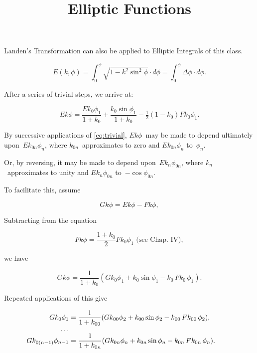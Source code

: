 \documentclass[12pt,letterpaper]{article}
\title{Elliptic Functions}
\begin{document}
	
	Landen's Transformation can also be applied to Elliptic Integrals of this class.
	
	\begin{equation}
	E(k, \phi) = \int_{0}^{\phi} \sqrt{1 - k^{2} \sin^{2} \phi} · d\phi
	= \int_{0}^{\phi} \Delta \phi · d\phi.
	\end{equation}
	
	After a series of trivial steps, we arrive at:
	
	\begin{equation}
	\label{eq:trivial}
	{Ek\phi} = \frac{Ek_{0}\phi_{1}}{1+k_{0}} + \frac{k_{0} \sin \phi_{1}}{1+k_{0}} - \tfrac{1}{2} (1 - k_{0})Fk_{0}\phi_{1}.
	\end{equation}
	
	By successive applications of \ref{eq:trivial}, $Ek\phi$~may be made to depend ultimately upon~$Ek_{0n}\phi_{n}$, where $k_{0n}$~approximates to zero and $Ek_{0n}\phi_{n}$ to~$\phi_{n}$.
	
	Or, by reversing, it may be made to depend upon~$Ek_{n}\phi_{0n}$,
	where $k_{n}$~approximates to unity and $Ek_{n}\phi_{0n}$ to~$-\cos \phi_{0n}$.
	
	To facilitate this, assume
	
	\begin{equation*}
	Gk\phi = Ek\phi - Fk\phi,
	\end{equation*}
	
	
	
	Subtracting from the equation
	
	\[
	Fk\phi = \frac{1 + k_{0}}{2} Fk_{0}\phi_{1} \text{ (see Chap.~IV)},
	\]
	
	we have
	
	\[
	Gk\phi = \frac{1}{1 + k_{0}}
	(Gk_{0}\phi_{1} + k_{0} \sin \phi_{1} - k_{0}\, Fk_{0}\, \phi_{1}).
	\]
	
	Repeated applications of this give
	
	\begin{equation}
		\begin{array}{r@{}l}
			Gk_{0}\phi_{1}
			&{}= \dfrac{1}{1 + k_{00}} (Gk_{00}\phi_{2} + k_{00} \sin \phi_{2} - k_{00}\, Fk_{00}\, \phi_{2}), \\
			\ldots \\
			\llap{$Gk_{0(n - 1)}\phi_{n - 1}$}
			&{}= \dfrac{1}{1 + k_{0n}} \rlap{$(Gk_{0n}\phi_{n} + k_{0n} \sin \phi_{n} - k_{0n}\, Fk_{0n}\, \phi_{n})$.}
		\end{array}
	\end{equation}
	
\end{document}
